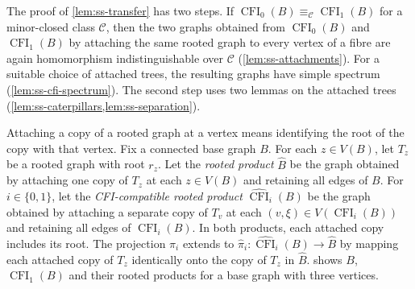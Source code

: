 \documentclass[10pt,a4paper]{article}
\theoremstyle{plain}
\theoremstyle{definition}
\DeclareMathOperator{\CFI}{CFI}
\begin{document}
The proof of \cref{lem:ss-transfer} has two steps.
If $\CFI_0(B)\equiv_{\mathcal C}\CFI_1(B)$ for a minor-closed class
$\mathcal C$, then the two graphs obtained from $\CFI_0(B)$ and
$\CFI_1(B)$ by attaching the same rooted graph to every vertex of a
fibre are again homomorphism indistinguishable over $\mathcal C$
(\cref{lem:ss-attachments}).
For a suitable choice of attached trees, the resulting graphs have
simple spectrum (\cref{lem:ss-cfi-spectrum}).
The second step uses two lemmas on the attached trees
(\cref{lem:ss-caterpillars,lem:ss-separation}).

Attaching a copy of a rooted graph at a vertex means identifying the
root of the copy with that vertex.
Fix a connected base graph $B$.
For each $z\in V(B)$, let $T_z$ be a rooted graph with root $r_z$.
Let the \emph{rooted product} $\widehat B$ be the graph obtained by
attaching one copy of $T_z$ at each $z\in V(B)$
and retaining all edges of $B$.
For $i\in\{0,1\}$, let the \emph{CFI-compatible rooted product}
$\widehat{\CFI}_i(B)$ be the graph obtained by attaching a separate copy
of $T_v$ at each $(v,\xi)\in V(\CFI_i(B))$ and retaining all edges of $\CFI_i(B)$.
In both products, each attached copy includes its root.
The projection $\pi_i$ extends to
$\widehat\pi_i:\widehat{\CFI}_i(B)\to\widehat B$ by mapping
each attached copy of $T_z$ identically onto the copy of $T_z$ in $\widehat B$.
 shows $B$, $\CFI_1(B)$ and their rooted
products for a base graph with three vertices.
\end{document}

